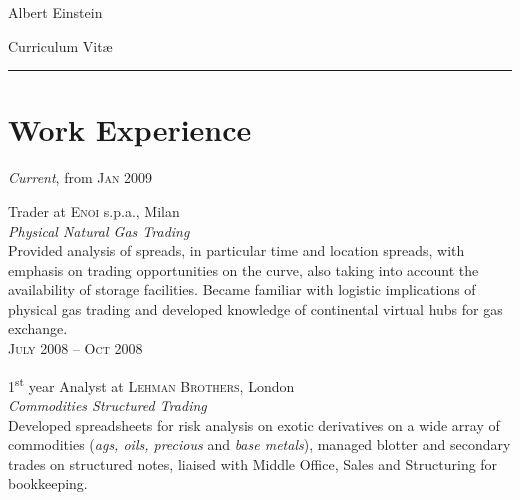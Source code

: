 \documentclass[10pt]{article}
\begin{document}
\color{text1} %

	\par{\centering
		{\sffamily\Huge Albert Einstein
	}\\	
	{\color{headings} 
			Curriculum 
			{Vit\ae}
		\\[25pt]\par}
	{\color{white} \hrule} %
	
\begin{minipage}[t]{0.5\textwidth} %

	\vspace{0pt}	%
	
\section{Work Experience}

	\raggedleft
	\emph{Current}, from \textsc{Jan 2009}\par

	\raggedright\large Trader at \textsc{Enoi} s.p.a., Milan\\
	\emph{Physical Natural Gas Trading}\\[5pt]

	\normalsize{Provided analysis of spreads, in particular time and location spreads, with emphasis on trading opportunities on the curve, also taking into account the availability of storage facilities. Became familiar with logistic implications of physical gas trading and developed knowledge of continental virtual hubs for gas exchange.}\\[10pt]

	\raggedleft
	\textsc{\normalsize July 2008 -- Oct 2008}\par

	\raggedright
	\large 1\textsuperscript{st} year Analyst at \textsc{Lehman Brothers}, London\\
\emph{Commodities Structured Trading}\\[5pt]

\normalsize{Developed spreadsheets for risk analysis on exotic derivatives on a wide array of commodities (\textit{ags, oils, precious} and \textit{base metals}), managed blotter and secondary trades on structured notes, liaised with Middle Office, Sales and Structuring for bookkeeping.}\\[10pt]


\end{minipage}}
\end{document}
